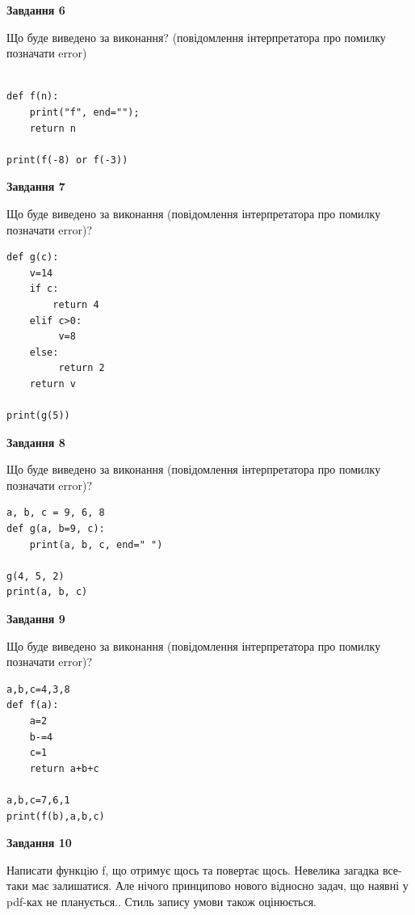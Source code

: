 \documentclass[12pt, ukrainian]{article}
\begin{document}
{\begin {large}
{\begin {center}\textbf{Завдання 6}\end {center}}

Що буде виведено за виконання? (повідомлення інтерпретатора про помилку позначати error)\par
\begin{verbatim}

def f(n):
    print("f", end="");
    return n

print(f(-8) or f(-3))
\end{verbatim}

{\begin {center}\textbf{Завдання 7}\end {center}}

Що буде виведено за виконання (повідомлення інтерпретатора про помилку позначати error)?\par
\begin{verbatim}
def g(c):
    v=14
    if c: 
        return 4
    elif c>0:
         v=8
    else:
         return 2
    return v

print(g(5))
\end{verbatim}

{\begin {center}\textbf{Завдання 8}\end {center}}

Що буде виведено за виконання (повідомлення інтерпретатора про помилку позначати error)?\par
\begin{verbatim}
a, b, c = 9, 6, 8
def g(a, b=9, c):
    print(a, b, c, end=" ")

g(4, 5, 2)
print(a, b, c)
\end{verbatim}

{\begin {center}\textbf{Завдання 9}\end {center}}

Що буде виведено за виконання (повідомлення інтерпретатора про помилку позначати error)?\par
\begin{verbatim}
a,b,c=4,3,8
def f(a):
    a=2
    b-=4
    c=1
    return a+b+c

a,b,c=7,6,1
print(f(b),a,b,c)
\end{verbatim}

{\begin {center}\textbf{Завдання 10}\end {center}}


Написати функцiю f, що отримує щось та повертає щось. Невелика загадка все-таки має залишатися. Але нічого принципово нового відносно задач, що наявні у pdf-ках не планується.. Стиль запису умови також оцінюється.\par
\end {large}}
\newpage
\end{document}
